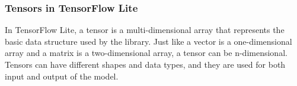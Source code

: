 \subsubsection{Tensors in TensorFlow Lite}
In TensorFlow Lite, a tensor is a multi-dimensional array that represents the basic data structure used by the library. Just like a vector is a one-dimensional array and a matrix is a two-dimensional array, a tensor can be n-dimensional. Tensors can have different shapes and data types, and they are used for both input and output of the model. \cite{TensorFlowLiteInference:2024}
%
%
%
%




